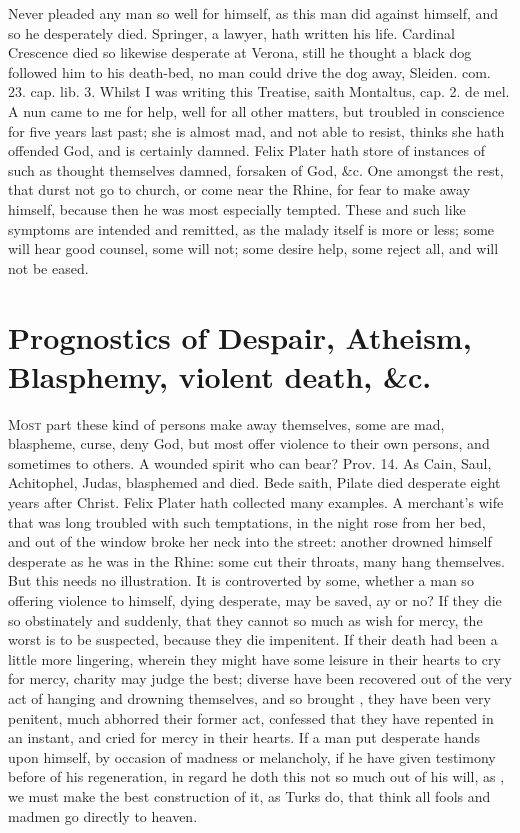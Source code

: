 {Never pleaded any man so well for himself, as this man did against
himself, and so he desperately died. Springer, a lawyer, hath written
his life. Cardinal Crescence died so likewise desperate at Verona,
still he thought a black dog followed him to his death-bed, no man
could drive the dog away, Sleiden. com. 23. cap. lib. 3. Whilst I was
writing this Treatise, saith Montaltus, cap. 2. de mel. A nun
came to me for help, well for all other matters, but troubled in
conscience for five years last past; she is almost mad, and not able to
resist, thinks she hath offended God, and is certainly damned. Felix
Plater hath store of instances of such as thought themselves damned,
 forsaken of God, \&c. One amongst the rest, that durst not go to
church, or come near the Rhine, for fear to make away himself, because
then he was most especially tempted. These and such like symptoms are
intended and remitted, as the malady itself is more or less; some will
hear good counsel, some will not; some desire help, some reject all,
and will not be eased.

\section[Prognostics of Despair]{Prognostics of Despair, Atheism, Blasphemy, violent death, \&c.}

\lettrine{M}{ost} part these kind of persons make away themselves, some are
mad, blaspheme, curse, deny God, but most offer violence to their own
persons, and sometimes to others. A wounded spirit who can bear? Prov.
 14. As Cain, Saul, Achitophel, Judas, blasphemed and died. Bede
saith, Pilate died desperate eight years after Christ. Felix
Plater hath collected many examples. A merchant's wife that was
long troubled with such temptations, in the night rose from her bed,
and out of the window broke her neck into the street: another drowned
himself desperate as he was in the Rhine: some cut their throats, many
hang themselves. But this needs no illustration. It is controverted by
some, whether a man so offering violence to himself, dying desperate,
may be saved, ay or no? If they die so obstinately and suddenly, that
they cannot so much as wish for mercy, the worst is to be suspected,
because they die impenitent. If their death had been a little
more lingering, wherein they might have some leisure in their hearts to
cry for mercy, charity may judge the best; diverse have been recovered
out of the very act of hanging and drowning themselves, and so brought
, they have been very penitent, much abhorred their
former act, confessed that they have repented in an instant, and cried
for mercy in their hearts. If a man put desperate hands upon himself,
by occasion of madness or melancholy, if he have given testimony before
of his regeneration, in regard he doth this not so much out of his
will, as , we must make the best construction of it, as
Turks do, that think all fools and madmen go directly to heaven.

}
